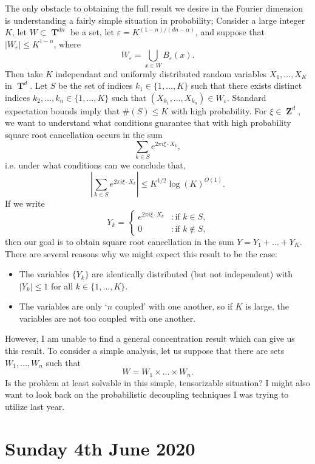 \documentclass[openany,nobib,nols,a4paper,twoside,symmetric,justified,notoc]{tufte-book}
\theoremstyle{plain}
\theoremstyle{remark}
\theoremstyle{definition}
\newcommand{\currentchapter}{}
\let\oldchapter\chapter
\renewcommand{\chapter}[1]{\oldchapter{#1}\renewcommand{\currentchapter}{#1}}
\DeclareMathOperator{\TT}{\mathbf{T}}
\DeclareMathOperator{\ZZ}{\mathbf{Z}}
\begin{document}
The only obstacle to obtaining the full result we desire in the Fourier dimension is understanding a fairly simple situation in probability; Consider a large integer $K$, let $W \subset \TT^{dn}$ be a set, let $\varepsilon = K^{(1 - n)/(dn - \alpha)}$, and suppose that $|W_\varepsilon| \leq K^{1-n}$, where
%
\[ W_\varepsilon = \bigcup_{x \in W} B_\varepsilon(x). \]
% 
Then take $K$ independant and uniformly distributed random variables $X_1, \dots, X_K$ in $\TT^d$. Let $S$ be the set of indices $k_1 \in \{ 1, \dots, K \}$ such that there exists distinct indices $k_2, \dots, k_n \in \{ 1, \dots, K \}$ such that $(X_{k_1}, \dots, X_{k_n}) \in W_\varepsilon$. Standard expectation bounds imply that $\#(S) \leq K$ with high probability. For $\xi \in \ZZ^d$, we want to understand what conditions guarantee that with high probability square root cancellation occurs in the sum
%
\[ \sum_{k \in S} e^{2 \pi i \xi \cdot X_k}, \]
%
i.e. under what conditions can we conclude that,
%
\[ \left| \sum_{k \in S} e^{2 \pi i \xi \cdot X_k} \right| \leq K^{1/2} \log(K)^{O(1)}. \]
%
If we write
%
\[ Y_k = \begin{cases} e^{2 \pi i \xi \cdot X_k} &: \text{if $k \in S$,}\\ 0 &: \text{if $k \not \in S$,} \end{cases} \]
%
then our goal is to obtain square root cancellation in the sum $Y = Y_1 + \dots + Y_K$. There are several reasons why we might expect this result to be the case:
%
\begin{itemize}
    \item The variables $\{ Y_k \}$ are identically distributed (but not independent) with $|Y_k| \leq 1$ for all $k \in \{ 1, \dots, K \}$.
    \item The variables are only `$n$ coupled' with one another, so if $K$ is large, the variables are not too coupled with one another. 
\end{itemize}
%
However, I am unable to find a general concentration result which can give us this result. To consider a simple analysis, let us suppose that there are sets $W_1, \dots, W_n$ such that
%
\[ W = W_1 \times \dots \times W_n. \]
%
Is the problem at least solvable in this simple, tensorizable situation? I might also want to look back on the probabilistic decoupling techniques I was trying to utilize last year.









\chapter{Sunday 4th June 2020} \label{04062020}
\end{document}
